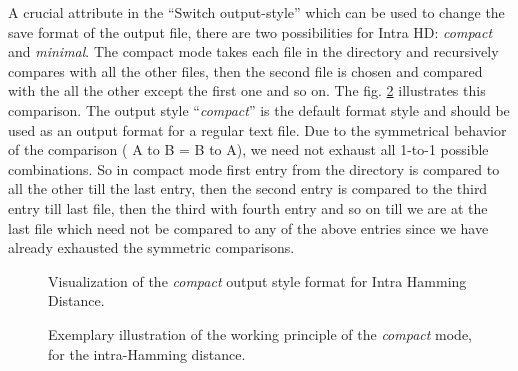 A crucial attribute in the ``Switch output-style'' which can be used to change the save format of the output file, there are two possibilities for Intra HD: \emph{compact} and \emph{minimal}. The compact mode takes each file in the directory and recursively compares with all the other files, then the second file is chosen and compared with the all the other except the first one and so on. The fig. \ref{img:4_intra_WP} illustrates this comparison.  The output style ``\emph{compact}'' is the default format style and should be used
as an output format for a regular text file. Due to the symmetrical behavior of the comparison ( A to B = B to A), we need not exhaust all 1-to-1 possible combinations. So in compact mode first entry from the directory is compared to all the other till the last entry, then the second entry is compared to the third entry till last file, then the third with fourth entry and so on till we are at the last file which need not be compared to any of the above entries since we have already exhausted the
symmetric comparisons.\\

\begin{figure}
\centering
{}
\caption{Visualization of the \emph{compact} output style format for Intra Hamming Distance.}
\label{img:4_intra_compact}
\end{figure}

\begin{figure}
\centering
{}
\caption{Exemplary illustration of the working principle of the \emph{compact} mode, for the intra-Hamming distance.}
\label{img:4_intra_WP}
\end{figure}

